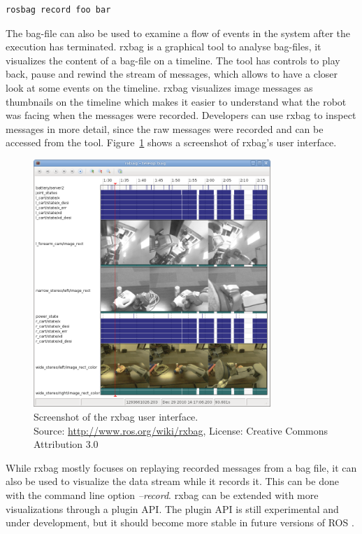\begin{lstlisting}[frame=single,caption={Example usage of rosbag.},label=rosbag_usage]
rosbag record foo bar
\end{lstlisting}

The bag-file can also be used to examine a flow of events in the system after the execution has terminated. rxbag is a graphical tool to analyse bag-files, it visualizes the content of a bag-file on a timeline. The tool has controls to play back, pause and rewind the stream of messages, which allows to have a closer look at some events on the timeline. rxbag visualizes image messages as thumbnails on the timeline which makes it easier to understand what the robot was facing when the messages were recorded. Developers can use rxbag to inspect messages in more detail, since the raw messages were recorded and can be accessed from the tool. Figure~\ref{rxbag_screenshot} shows a screenshot of rxbag's user interface.

\begin{figure}[htbp]
  \centering
  \includegraphics[width=0.8\textwidth]{img/rxbag_screenshot.png}
  \caption{Screenshot of the rxbag user interface.\\Source: \url{http://www.ros.org/wiki/rxbag}, License: Creative Commons Attribution 3.0}
  \label{rxbag_screenshot}
\end{figure}

While rxbag mostly focuses on replaying recorded messages from a bag file, it can also be used to visualize the data stream while it records it. This can be done with the command line option \emph{--record}. rxbag can be extended with more visualizations through a plugin API. The plugin API is still experimental and under development, but it should become more stable in future versions of ROS \cite{rxbag}.

